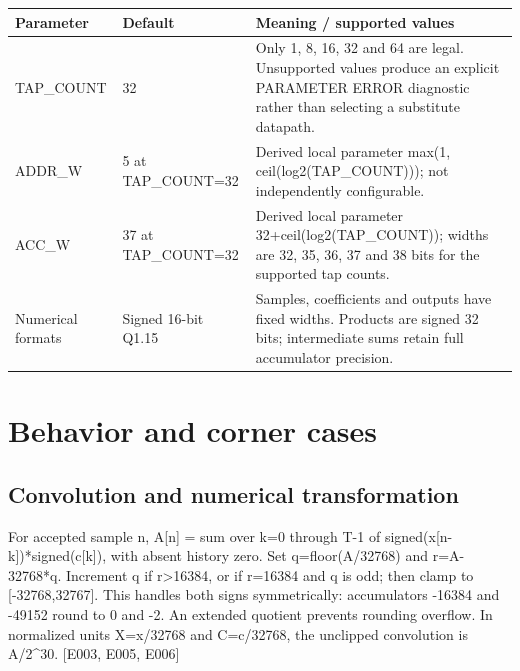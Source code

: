 \documentclass[11pt,a4paper]{article}
\begin{document}
{\small\renewcommand{\arraystretch}{1.18}\begin{longtable}{@{}L{0.22\textwidth}|L{0.21\textwidth}|L{0.49\textwidth}@{}}\toprule

\textbf{Parameter} & \textbf{Default} & \textbf{Meaning /\allowbreak{} supported values}\\\midrule\endhead

TAP\_\allowbreak{}COUNT & 32 & Only 1,\allowbreak{} 8,\allowbreak{} 16,\allowbreak{} 32 and 64 are legal. Unsupported values produce an explicit PARAMETER ERROR diagnostic rather than selecting a substitute datapath.\\[2pt]\hline

ADDR\_\allowbreak{}W & 5 at TAP\_\allowbreak{}COUNT=\allowbreak{}32 & Derived local parameter max(\allowbreak{}1,\allowbreak{} ceil(\allowbreak{}log2(\allowbreak{}TAP\_\allowbreak{}COUNT)\allowbreak{})\allowbreak{})\allowbreak{}; not independently configurable.\\[2pt]\hline

ACC\_\allowbreak{}W & 37 at TAP\_\allowbreak{}COUNT=\allowbreak{}32 & Derived local parameter 32+\allowbreak{}ceil(\allowbreak{}log2(\allowbreak{}TAP\_\allowbreak{}COUNT)\allowbreak{})\allowbreak{}; widths are 32,\allowbreak{} 35,\allowbreak{} 36,\allowbreak{} 37 and 38 bits for the supported tap counts.\\[2pt]\hline

Numerical formats & Signed 16-bit Q1.15 & Samples,\allowbreak{} coefficients and outputs have fixed widths. Products are signed 32 bits; intermediate sums retain full accumulator precision.\\[2pt]\hline

\bottomrule\end{longtable}}

\section{Behavior and corner cases}

\subsection{Convolution and numerical transformation}

For accepted sample n,\allowbreak{} A[\allowbreak{}n]\allowbreak{} =\allowbreak{} sum over k=\allowbreak{}0 through T-1 of signed(\allowbreak{}x[\allowbreak{}n-k]\allowbreak{})\allowbreak{}*\allowbreak{}signed(\allowbreak{}c[\allowbreak{}k]\allowbreak{})\allowbreak{},\allowbreak{} with absent history zero. Set q=\allowbreak{}floor(\allowbreak{}A/\allowbreak{}32768)\allowbreak{} and r=\allowbreak{}A-32768*\allowbreak{}q. Increment q if r>16384,\allowbreak{} or if r=\allowbreak{}16384 and q is odd; then clamp to [\allowbreak{}-32768,\allowbreak{}32767]\allowbreak{}. This handles both signs symmetrically: accumulators -16384 and -49152 round to 0 and -2. An extended quotient prevents rounding overflow. In normalized units X=\allowbreak{}x/\allowbreak{}32768 and C=\allowbreak{}c/\allowbreak{}32768,\allowbreak{} the unclipped convolution is A/\allowbreak{}2\textasciicircum{}30. [\allowbreak{}E003,\allowbreak{} E005,\allowbreak{} E006]\allowbreak{}
\end{document}
